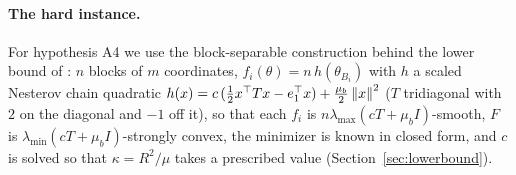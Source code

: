 \paragraph{The hard instance.}
For hypothesis A4 we use the block-separable construction behind the lower bound of \cite{lan2018optimal}: $n$
blocks of $m$ coordinates, $f_i(\theta) = n\,h(\theta_{B_i})$ with $h$ a scaled Nesterov chain quadratic
$h(x) = c\,(\tfrac12 x^\top T x - e_1^\top x) + \tfrac{\mu_b}{2}\left\|x\right\|^2$ ($T$ tridiagonal with $2$ on the
diagonal and $-1$ off it), so that each $f_i$ is $n\lambda_{\max}(cT + \mu_b I)$-smooth, $F$ is
$\lambda_{\min}(cT + \mu_b I)$-strongly convex, the minimizer is known in closed form, and $c$ is solved so that
$\kappa = R^2/\mu$ takes a prescribed value (Section~\ref{sec:lowerbound}).
